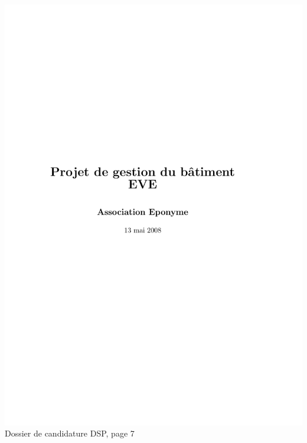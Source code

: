\includegraphics[scale=0.85,trim=20mm 20mm 20mm 20mm,clip,page=7]{annexes/candidature_dsp.pdf} \\
Dossier de candidature DSP, page 7
\newpage
